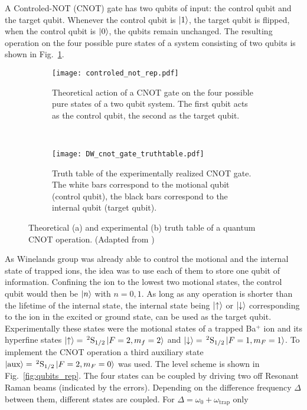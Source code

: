 A Controled-NOT (CNOT) gate has two qubits of input: the control qubit and the
target qubit. Whenever the control qubit is $\ket{1}$, the target qubit is
flipped, when the control qubit is $\ket{0}$, the qubits remain unchanged. The
resulting operation on the four possible pure states of a system consisting  of two qubits
is shown in Fig.~\ref{fig:cnot_theory}.
\begin{figure}[t]
  \centering
  \begin{subfigure}[t]{0.48\linewidth} 
    \centering
    \texttt{[image: controled\_not\_rep.pdf]}
    \caption{Theoretical action of a CNOT gate on the four possible pure states of a two
    qubit system. The first qubit acts as the control qubit, the second as the
  target qubit.}
    \label{fig:cnot_theory}
  \end{subfigure}
  ~
  \begin{subfigure}[t]{0.48\linewidth} 
    \centering
    \texttt{[image: DW\_cnot\_gate\_truthtable.pdf]}
    \caption{Truth table of the experimentally realized CNOT gate. The white bars
    correspond to the motional qubit (control qubit), the black bars correspond
  to the internal qubit (target qubit).}
    \label{fig:cnot_experiment}
  \end{subfigure}
  \caption{Theoretical (a) and experimental (b) truth table of a quantum CNOT
  operation. (Adapted from \cite{monroe1995demonstration})}
\end{figure}
As Winelands group was already able to control the motional and the internal
state of trapped ions, the idea was to use each of them to store one qubit of
information. Confining the ion to the lowest two motional states, the control
qubit would then be $\ket{n}$ with $n=0,1$. As long as any operation is shorter
than the lifetime of the internal state, the internal state being
$\ket{\uparrow}$ or $\ket{\downarrow}$ corresponding to the ion in the
excited or ground state, can be used as the target qubit. Experimentally these
states were the motional states of a trapped Ba$^+$ ion and its hyperfine states
$\ket{\uparrow} =\, ^2\text{S}_{1/2}\ket{F=2, m_f=2}$ and $\ket{\downarrow} =
\,^2\text{S}_{1/2}\ket{F=1, m_F=1}$. To implement the CNOT operation a third
auxiliary state $\ket{\text{aux}} = \,^2\text{S}_{1/2}\ket{F=2, m_F=0}$ was
used. The level scheme is shown in Fig.~\ref{fig:qubits_rep}. The four states
can be coupled by driving two off Resonant Raman beams (indicated by the
errors). Depending on the difference frequency $\Delta$ between them, different states
are coupled. For $\Delta = \omega_0 + \omega_\text{trap}$ only
